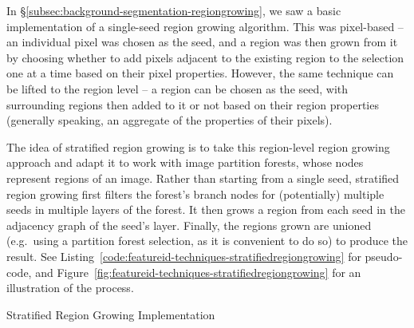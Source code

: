 
In \S\ref{subsec:background-segmentation-regiongrowing}, we saw a basic implementation of a single-seed region growing algorithm. This was pixel-based -- an individual pixel was chosen as the seed, and a region was then grown from it by choosing whether to add pixels adjacent to the existing region to the selection one at a time based on their pixel properties. However, the same technique can be lifted to the region level -- a region can be chosen as the seed, with surrounding regions then added to it or not based on their region properties (generally speaking, an aggregate of the properties of their pixels).

The idea of stratified region growing is to take this region-level region growing approach and adapt it to work with image partition forests, whose nodes represent regions of an image. Rather than starting from a single seed, stratified region growing first filters the forest's branch nodes for (potentially) multiple seeds in multiple layers of the forest. It then grows a region from each seed in the adjacency graph of the seed's layer. Finally, the regions grown are unioned (e.g.~using a partition forest selection, as it is convenient to do so) to produce the result. See Listing~\ref{code:featureid-techniques-stratifiedregiongrowing} for pseudo-code, and Figure~\ref{fig:featureid-techniques-stratifiedregiongrowing} for an illustration of the process.

\begin{stulisting}[p]
\caption{Stratified Region Growing Implementation}
\label{code:featureid-techniques-stratifiedregiongrowing}

\end{stulisting}

